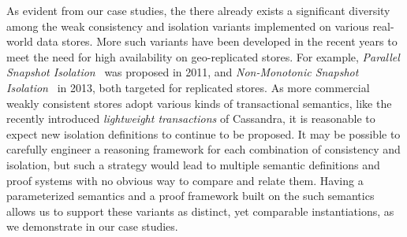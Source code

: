As evident from our case studies, the there already exists a
significant diversity among the weak consistency and isolation
variants implemented on various real-world data stores. More such
variants have been developed in the recent years to meet the need for
high availability on geo-replicated stores. For example,
\emph{Parallel Snapshot Isolation}~\cite{psi} was proposed in 2011,
and \emph{Non-Monotonic Snapshot Isolation}~\cite{nmsi} in 2013, both
targeted for replicated stores. As more commercial weakly consistent
stores adopt various kinds of transactional semantics, like the
recently introduced \emph{lightweight transactions} of Cassandra, it
is reasonable to expect new isolation definitions to continue to be
proposed. It may be possible to carefully engineer a reasoning
framework for each combination of consistency and isolation, but such
a strategy would lead to multiple semantic definitions and proof
systems with no obvious way to compare and relate them. Having a
parameterized semantics and a proof framework built on the such
semantics allows us to support these variants as distinct, yet
comparable instantiations, as we demonstrate in our case studies.





